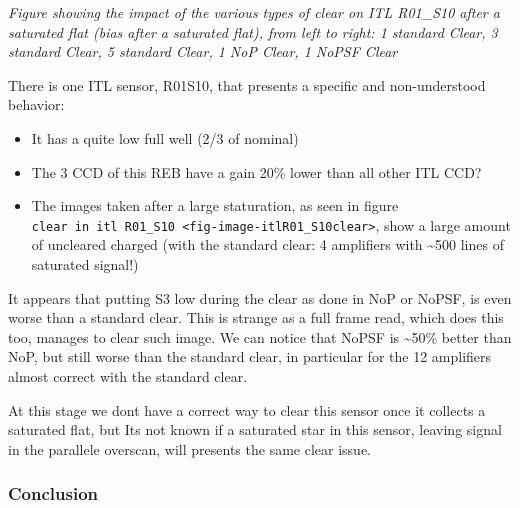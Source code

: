 \emph{Figure showing the impact of the various types of clear on ITL
R01\_S10 after a saturated flat (bias after a saturated flat), from left
to right: 1 standard Clear, 3 standard Clear, 5 standard Clear, 1 NoP
Clear, 1 NoPSF Clear}

There is one ITL sensor, R01\label{s10}{S10}, that
presents a specific and non-understood behavior:

\begin{itemize}
\tightlist
\item
  It has a quite low full well (2/3 of nominal)
\item
  The 3 CCD of this REB have a gain 20\% lower than all other ITL CCD?
\item
  The images taken after a large staturation, as seen in figure
  \texttt{clear\ in\ itl\ R01\_S10\ \textless{}fig-image-itlR01\_S10clear\textgreater{}},
  show a large amount of uncleared charged (with the standard clear: 4
  amplifiers with \textasciitilde500 lines of saturated signal!)
\end{itemize}

It appears that putting S3 low during the clear as done in NoP or NoPSF,
is even worse than a standard clear. This is strange as a full frame
read, which does this too, manages to clear such image. We can notice
that NoPSF is \textasciitilde50\% better than NoP, but still worse than
the standard clear, in particular for the 12 amplifiers almost correct
with the standard clear.

At this stage we don\textquotesingle t have a correct way to clear this
sensor once it collects a saturated flat, but It\textquotesingle s not
known if a saturated star in this sensor, leaving signal in the
parallele overscan, will presents the same clear issue.

\subsubsection{Conclusion}\label{conclusion}


